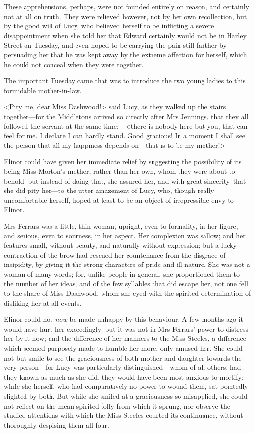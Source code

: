 These apprehensions, perhaps, were not founded entirely on reason, and certainly not at all on truth. They were relieved however, not by her own recollection, but by the good will of Lucy, who believed herself to be inflicting a severe disappointment when she told her that Edward certainly would not be in Harley Street on Tuesday, and even hoped to be carrying the pain still farther by persuading her that he was kept away by the extreme affection for herself, which he could not conceal when they were together.

The important Tuesday came that was to introduce the two young ladies to this formidable mother-in-law.

<Pity me, dear Miss Dashwood!> said Lucy, as they walked up the stairs together—for the Middletons arrived so directly after Mrs Jennings, that they all followed the servant at the same time:—<there is nobody here but you, that can feel for me. I declare I can hardly stand. Good gracious! In a moment I shall see the person that all my happiness depends on—that is to be my mother!>

Elinor could have given her immediate relief by suggesting the possibility of its being Miss Morton's mother, rather than her own, whom they were about to behold; but instead of doing that, she assured her, and with great sincerity, that she did pity her—to the utter amazement of Lucy, who, though really uncomfortable herself, hoped at least to be an object of irrepressible envy to Elinor.

Mrs Ferrars was a little, thin woman, upright, even to formality, in her figure, and serious, even to sourness, in her aspect. Her complexion was sallow; and her features small, without beauty, and naturally without expression; but a lucky contraction of the brow had rescued her countenance from the disgrace of insipidity, by giving it the strong characters of pride and ill nature. She was not a woman of many words; for, unlike people in general, she proportioned them to the number of her ideas; and of the few syllables that did escape her, not one fell to the share of Miss Dashwood, whom she eyed with the spirited determination of disliking her at all events.

Elinor could not \textit{now} be made unhappy by this behaviour. A few months ago it would have hurt her exceedingly; but it was not in Mrs Ferrars' power to distress her by it now; and the difference of her manners to the Miss Steeles, a difference which seemed purposely made to humble her more, only amused her. She could not but smile to see the graciousness of both mother and daughter towards the very person—for Lucy was particularly distinguished—whom of all others, had they known as much as she did, they would have been most anxious to mortify; while she herself, who had comparatively no power to wound them, sat pointedly slighted by both. But while she smiled at a graciousness so misapplied, she could not reflect on the mean-spirited folly from which it sprung, nor observe the studied attentions with which the Miss Steeles courted its continuance, without thoroughly despising them all four.

